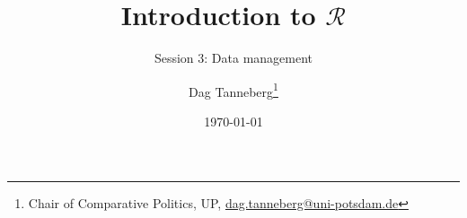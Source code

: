 \usepackage[utf8]{inputenc}
\usepackage{hyperref}
\usepackage{graphicx}
\usepackage{booktabs}

\title{Introduction to $\mathcal{R}$}
\subtitle{Session 3: Data management}
\author{Dag Tanneberg\thanks{%
  Chair of Comparative Politics, UP, %
  \href{mailto:dag.tanneberg@uni-potsdam.de}%
    {dag.tanneberg@uni-potsdam.de}
  }
}
\date{\today}


